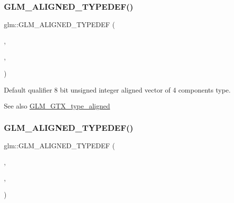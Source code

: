 \subsubsection{\texorpdfstring{G\+L\+M\+\_\+\+A\+L\+I\+G\+N\+E\+D\+\_\+\+T\+Y\+P\+E\+D\+E\+F()}{GLM\_ALIGNED\_TYPEDEF()}\hspace{0.1cm}{\footnotesize\ttfamily [124/209]}}
{\footnotesize\ttfamily glm\+::\+G\+L\+M\+\_\+\+A\+L\+I\+G\+N\+E\+D\+\_\+\+T\+Y\+P\+E\+D\+EF (\begin{DoxyParamCaption}\item[{\hyperlink{group__gtc__type__precision_ga6c8841fa492bd5b1078b171452fd6974}{u8vec4}}]{,  }\item[{aligned\+\_\+u8vec4}]{,  }\item[{4}]{ }\end{DoxyParamCaption})}

Default qualifier 8 bit unsigned integer aligned vector of 4 components type. \begin{DoxySeeAlso}{See also}
\hyperlink{group__gtx__type__aligned}{G\+L\+M\+\_\+\+G\+T\+X\+\_\+type\+\_\+aligned} 
\end{DoxySeeAlso}
\mbox{\label{group__gtx__type__aligned_ga991abe990c16de26b2129d6bc2f4c051}} 
\subsubsection{\texorpdfstring{G\+L\+M\+\_\+\+A\+L\+I\+G\+N\+E\+D\+\_\+\+T\+Y\+P\+E\+D\+E\+F()}{GLM\_ALIGNED\_TYPEDEF()}\hspace{0.1cm}{\footnotesize\ttfamily [125/209]}}
{\footnotesize\ttfamily glm\+::\+G\+L\+M\+\_\+\+A\+L\+I\+G\+N\+E\+D\+\_\+\+T\+Y\+P\+E\+D\+EF (\begin{DoxyParamCaption}\item[{\hyperlink{group__gtc__type__precision_ga40d9e5ab8120f10efcfd7c88436c4a81}{u16vec1}}]{,  }\item[{aligned\+\_\+u16vec1}]{,  }\item[{2}]{ }\end{DoxyParamCaption})}

